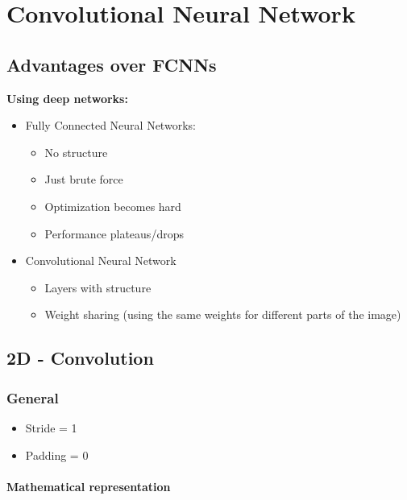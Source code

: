 \documentclass[10pt,a4paper]{article}
\newcommand{\cons}{\textcolor{red}{\textbf{\textendash}}}
\newcommand{\pros}{\textcolor{green}{\textbf{+}}}
\newcommand{\icons}{\item[\cons]}
\newcommand{\ipros}{\item[\pros]}
\begin{document}
\pagebreak

\section{Convolutional Neural Network}
\subsection{Advantages over FCNNs}
\textbf{Using deep networks:}
\begin{itemize}
	\item Fully Connected Neural Networks:
	\begin{itemize}
		\icons No structure
		\icons Just brute force
		\icons Optimization becomes hard
		\icons Performance plateaus/drops
	\end{itemize}
	\item Convolutional Neural Network
	\begin{itemize}
		\ipros Layers with structure
		\ipros Weight sharing (using the same weights for different parts of the image) 
	\end{itemize}
\end{itemize}

\subsection{2D - Convolution}
\subsubsection{General}
\begin{itemize}
	\item Stride = 1
	\item Padding = 0
\end{itemize}
\paragraph{Mathematical representation} ~\\
\end{document}
